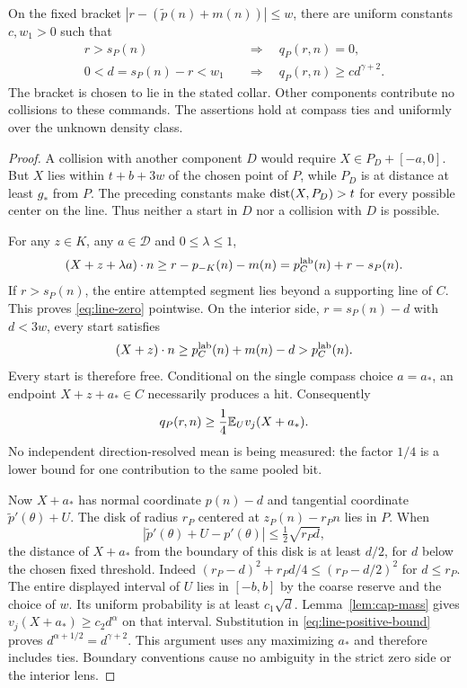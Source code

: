 \begin{lemma}\label{lem:line-response}
On the fixed bracket
$|r-(\widetilde p(n)+m(n))|\le w$, there are uniform constants $c,w_1>0$
such that
\begin{align}
 r>s_P(n)&\quad\Longrightarrow\quad q_P(r,n)=0,
                                               \label{eq:line-zero}\\
 0<d=s_P(n)-r<w_1&\quad\Longrightarrow\quad
                q_P(r,n)\ge c d^{\gamma+2}.     \label{eq:line-mass}
\end{align}
The bracket is chosen to lie in the stated collar. Other components
contribute no collisions to these commands. The assertions hold at
compass ties and uniformly over the unknown density class.
\end{lemma}
\begin{proof}
A collision with another component $D$ would require
$X\in P_D+[-a,0]$. But $X$ lies within $t+b+3w$ of the chosen
point of $P$, while $P_D$ is at distance at least $g_*$ from $P$.
The preceding constants make $\operatorname{dist}(X,P_D)>t$ for every possible
center on the line. Thus neither a start in $D$ nor a collision with
$D$ is possible.

For any $z\in K$, any $a\in\mathcal D$ and $0\le\lambda\le1$,
\[
 (X+z+\lambda a)\cdot n
 \ge r-p_{-K}(n)-m(n)
   =p_C^{\rm lab}(n)+r-s_P(n).
\]
If $r>s_P(n)$, the entire attempted segment lies beyond a supporting
line of $C$. This proves \eqref{eq:line-zero} pointwise. On the
interior side, $r=s_P(n)-d$ with $d<3w$, every start satisfies
\[
 (X+z)\cdot n\ge p_C^{\rm lab}(n)+m(n)-d
                         >p_C^{\rm lab}(n).
\]
Every start is therefore free. Conditional on the single compass
choice $a=a_*$, an endpoint $X+z+a_*\in C$ necessarily produces a
hit. Consequently
\begin{equation}\label{eq:line-positive-bound}
       q_P(r,n)\ge\frac14\mathbb E_U v_j(X+a_*).
\end{equation}
No independent direction-resolved mean is being measured: the factor
$1/4$ is a lower bound for one contribution to the same pooled bit.

Now $X+a_*$ has normal coordinate $p(n)-d$ and tangential coordinate
$\widetilde p'(\theta)+U$. The disk of radius $r_P$ centered at
$z_P(n)-r_Pn$ lies in $P$. When
\[
 |\widetilde p'(\theta)+U-p'(\theta)|
                            \le\tfrac12\sqrt{r_Pd},
\]
the distance of $X+a_*$ from the boundary of this disk is at least
$d/2$, for $d$ below the chosen fixed threshold. Indeed
$(r_P-d)^2+r_Pd/4\le(r_P-d/2)^2$ for $d\le r_P$.
The entire displayed interval of $U$ lies in $[-b,b]$ by the coarse
reserve and the choice of $w$. Its uniform probability is at least
$c_1\sqrt d$. Lemma~\ref{lem:cap-mass} gives
$v_j(X+a_*)\ge c_2d^\alpha$ on that interval. Substitution in
\eqref{eq:line-positive-bound} proves
$d^{\alpha+1/2}=d^{\gamma+2}$. This argument uses any maximizing
$a_*$ and therefore includes ties. Boundary conventions cause no
ambiguity in the strict zero side or the interior lens.
\end{proof}

